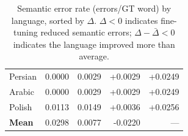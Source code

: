 \documentclass{article}
\begin{document}
\begin{table}[H]
\begin{tabular}{lrrrr}
    Persian & 0.0000 & 0.0029 & +0.0029 & +0.0249 \\
    Arabic & 0.0000 & 0.0029 & +0.0029 & +0.0249 \\
    Polish & 0.0113 & 0.0149 & +0.0036 & +0.0256 \\
\midrule
    \textbf{Mean} & 0.0298 & 0.0077 & -0.0220 & --- \\
\bottomrule
\end{tabular}
\caption{Semantic error rate (errors/GT word) by language, sorted by $\Delta$.
  $\Delta < 0$ indicates fine-tuning reduced semantic errors;
  $\Delta - \bar{\Delta} < 0$ indicates the language improved more than average.}
\label{tab:delta}
\end{table}
\end{document}
